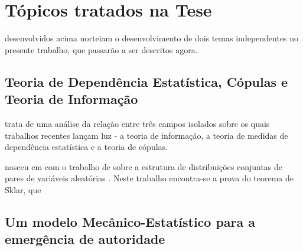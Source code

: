 \section{Tópicos tratados na Tese}
 desenvolvidos acima norteiam o desenvolvimento de dois temas independentes no presente trabalho, que passarão a ser descritos agora. 

\subsection{Teoria de Dependência Estatística, Cópulas e Teoria de Informação}

 trata de uma análise da relação entre três campos isolados sobre os quais trabalhos recentes lançam luz - a teoria de informação, a teoria de medidas de dependência estatística e a teoria de cópulas. 

 nasceu em \citeyear{Sklar1959} com o trabalho\cite{Sklar1959} de \citeauthor{Sklar1959} sobre a estrutura de distribuições conjuntas de pares de variáveis aleatórias . Neste trabalho encontra-se a prova do teorema de Sklar, que 


\subsection{Um modelo Mecânico-Estatístico para a emergência de autoridade}